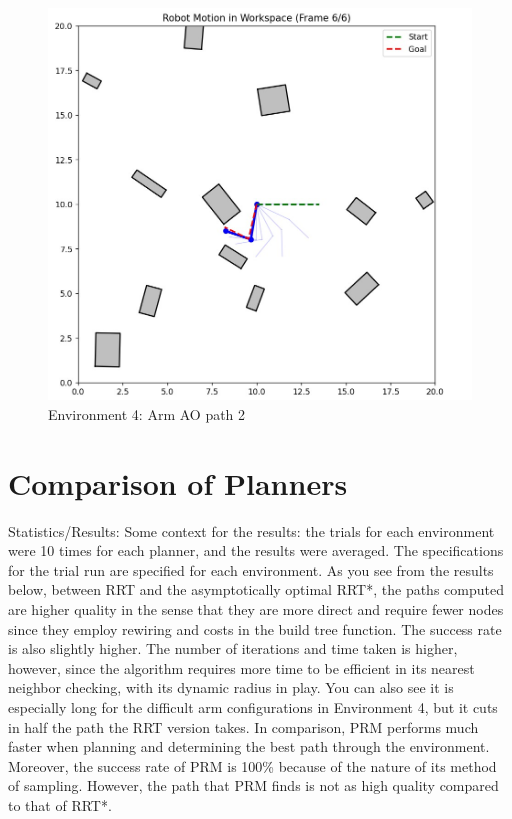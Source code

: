 \documentclass{article}
\begin{document}
\begin{figure} [H]
    \centering
    \includegraphics[width=0.5\linewidth]{latex_media/Env4AORobotPathA2.jpg}
    \caption{Environment 4: Arm AO path 2}
\end{figure}

\newpage
\section{Comparison of Planners}
Statistics/Results: \newline
Some context for the results: the trials for each environment were 10 times for each planner, and the results were averaged. The specifications for the trial run are specified for each environment. As you see from the results below, between RRT and the asymptotically optimal RRT*, the paths computed are higher quality in the sense that they are more direct and require fewer nodes since they employ rewiring and costs in the build tree function. The success rate is also slightly higher. The number of iterations and time taken is higher, however, since the algorithm requires more time to be efficient in its nearest neighbor checking, with its dynamic radius in play. You can also see it is especially long for the difficult arm configurations in Environment 4, but it cuts in half the path the RRT version takes. In comparison, PRM performs much faster when planning and determining the best path through the environment. Moreover, the success rate of PRM is 100\% because of the nature of its method of sampling. However, the path that PRM finds is not as high quality compared to that of RRT*. \newline
\end{document}
